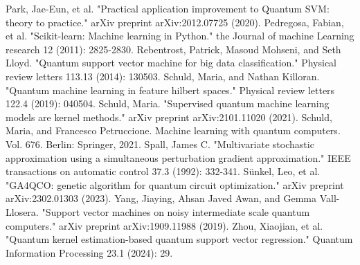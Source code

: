 \documentclass[12pt]{article}
\begin{document}
\begin{thebibliography}{9}
    Park, Jae-Eun, et al. "Practical application improvement to Quantum SVM: theory to practice." arXiv preprint arXiv:2012.07725 (2020).    
    Pedregosa, Fabian, et al. "Scikit-learn: Machine learning in Python." the Journal of machine Learning research 12 (2011): 2825-2830.    
    Rebentrost, Patrick, Masoud Mohseni, and Seth Lloyd. "Quantum support vector machine for big data classification." Physical review letters 113.13 (2014): 130503.    
    Schuld, Maria, and Nathan Killoran. "Quantum machine learning in feature hilbert spaces." Physical review letters 122.4 (2019): 040504.    
    Schuld, Maria. "Supervised quantum machine learning models are kernel methods." arXiv preprint arXiv:2101.11020 (2021).    
    Schuld, Maria, and Francesco Petruccione. Machine learning with quantum computers. Vol. 676. Berlin: Springer, 2021.    
    Spall, James C. "Multivariate stochastic approximation using a simultaneous perturbation gradient approximation." IEEE transactions on automatic control 37.3 (1992): 332-341.    
    Sünkel, Leo, et al. "GA4QCO: genetic algorithm for quantum circuit optimization." arXiv preprint arXiv:2302.01303 (2023).    
    Yang, Jiaying, Ahsan Javed Awan, and Gemma Vall-Llosera. "Support vector machines on noisy intermediate scale quantum computers." arXiv preprint arXiv:1909.11988 (2019).    
    Zhou, Xiaojian, et al. "Quantum kernel estimation-based quantum support vector regression." Quantum Information Processing 23.1 (2024): 29.    




\end{thebibliography}
\end{document}
